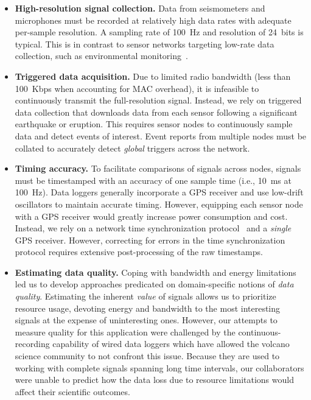 \begin{itemize}

\item \textbf{High-resolution signal collection.} Data from seismometers and
microphones must be recorded at relatively high data rates with adequate
per-sample resolution. A sampling rate of 100~Hz and resolution of 24~bits is
typical. This is in contrast to sensor networks targeting low-rate data
collection, such as environmental
monitoring~\cite{gdi-sensys04,berkeley-redwoods}.

\item \textbf{Triggered data acquisition.} Due to limited radio bandwidth
(less than 100~Kbps when accounting for MAC overhead), it is infeasible to
continuously transmit the full-resolution signal. Instead, we rely on
triggered data collection that downloads data from each sensor following a
significant earthquake or eruption. This requires sensor nodes to
continuously sample data and detect events of interest. Event reports from
multiple nodes must be collated to accurately detect \textit{global} triggers
across the network.

\item \textbf{Timing accuracy.} To facilitate comparisons of signals across
nodes, signals must be timestamped with an accuracy of one sample time (i.e.,
10~ms at 100~Hz). Data loggers generally incorporate a GPS receiver and use
low-drift oscillators to maintain accurate timing. However, equipping each
sensor node with a GPS receiver would greatly increase power consumption and
cost. Instead, we rely on a network time synchronization
protocol~\cite{rbs,ftsp} and a \textit{single} GPS receiver. However,
correcting for errors in the time synchronization protocol requires extensive
post-processing of the raw timestamps.

\item \textbf{Estimating data quality.} Coping with bandwidth and energy
limitations led us to develop approaches predicated on domain-specific
notions of \textit{data quality}. Estimating the inherent \textit{value} of
signals allows us to prioritize resource usage, devoting energy and bandwidth
to the most interesting signals at the expense of uninteresting ones.
However, our attempts to measure quality for this application were challenged
by the continuous-recording capability of wired data loggers which have
allowed the volcano science community to not confront this issue. Because
they are used to working with complete signals spanning long time intervals,
our collaborators were unable to predict how the data loss due to resource
limitations would affect their scientific outcomes.


\end{itemize}
